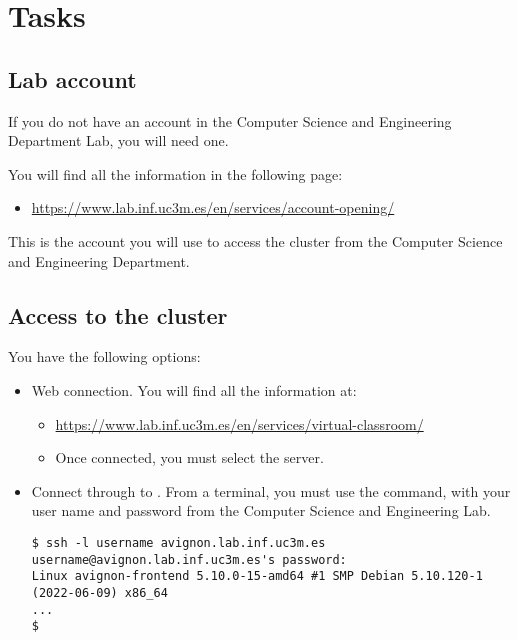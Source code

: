 \section{Tasks}

\subsection{Lab account}

If you do not have an account in the Computer Science and Engineering Department Lab, 
you will need one.

You will find all the information in the following page:

\begin{itemize}
  \item \url{https://www.lab.inf.uc3m.es/en/services/account-opening/}
\end{itemize}

This is the account you will use to access the cluster from the Computer Science
and Engineering Department.

\subsection{Access to the cluster}

You have the following options:


\begin{itemize}
  \item Web connection. You will find all the information at:
    \begin{itemize}
      \item \url{https://www.lab.inf.uc3m.es/en/services/virtual-classroom/}
      \item Once connected, you must select the  server.
    \end{itemize}

  \item Connect through  to . 
        From a terminal, you must use the  command, with
        your user name and password from the Computer Science and Engineering Lab.
\begin{lstlisting}[style=terminal]
$ ssh -l username avignon.lab.inf.uc3m.es
username@avignon.lab.inf.uc3m.es's password: 
Linux avignon-frontend 5.10.0-15-amd64 #1 SMP Debian 5.10.120-1 (2022-06-09) x86_64
...
$
\end{lstlisting}

\end{itemize}

